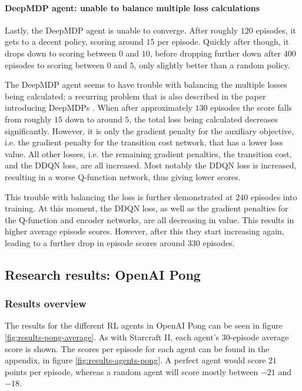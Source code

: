 \paragraph{DeepMDP agent: unable to balance multiple loss calculations}

Lastly, the DeepMDP agent is unable to converge. After roughly $120$ episodes, it gets to a decent policy, scoring around $15$ per episode. Quickly after though, it drops down to scoring between $0$ and $10$, before dropping further down after $400$ episodes to scoring between $0$ and $5$, only slightly better than a random policy.

The DeepMDP agent seems to have trouble with balancing the multiple losses being calculated; a recurring problem that is also described in the paper introducing DeepMDPs \cite{deepmdp}. When after approximately $130$ episodes the score falls from roughly $15$ down to around $5$, the total loss being calculated decreases significantly. However, it is only the gradient penalty for the auxiliary objective, i.e. the gradient penalty for the transition cost network, that has a lower loss value.  All other losses, i.e. the remaining gradient penalties, the transition cost, and the DDQN loss, are all increased. Most notably the DDQN loss is increased, resulting in a worse Q-function network, thus giving lower scores.

This trouble with balancing the loss is further demonstrated at $240$ episodes into training. At this moment, the DDQN loss, as well as the gradient penalties for the Q-function and encoder networks, are all decreasing in value. This results in higher average episode scores. However, after this they start increasing again, leading to a further drop in episode scores around $330$ episodes.

\clearpage
\subsection{Research results: OpenAI Pong}\label{research-results-pong}
\subsubsection{Results overview}
The results for the different RL agents in OpenAI Pong can be seen in figure \ref{fig:results-pong-average}. As with Starcraft II, each agent's 30-episode average score is shown. The scores per episode for each agent can be found in the appendix, in figure \ref{fig:results-agents-pong}. A perfect agent would score $21$ points per episode, whereas a random agent will score mostly between $-21$ and $-18$.

